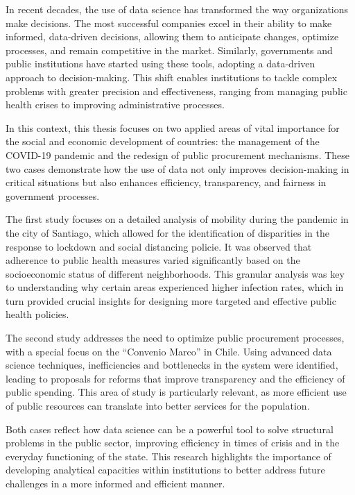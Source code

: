 

In recent decades, the use of data science has transformed the way organizations make decisions. The most successful companies excel in their ability to make informed, data-driven decisions, allowing them to anticipate changes, optimize processes, and remain competitive in the market. Similarly, governments and public institutions have started using these tools, adopting a data-driven approach to decision-making. This shift enables institutions to tackle complex problems with greater precision and effectiveness, ranging from managing public health crises to improving administrative processes.

In this context, this thesis focuses on two applied areas of vital importance for the social and economic development of countries: the management of the COVID-19 pandemic and the redesign of public procurement mechanisms. These two cases demonstrate how the use of data not only improves decision-making in critical situations but also enhances efficiency, transparency, and fairness in government processes.

The first study focuses on a detailed analysis of mobility during the pandemic in the city of Santiago, which allowed for the identification of disparities in the response to lockdown and social distancing policie. It was observed that adherence to public health measures varied significantly based on the socioeconomic status of different neighborhoods. This granular analysis was key to understanding why certain areas experienced higher infection rates, which in turn provided crucial insights for designing more targeted and effective public health policies.

The second study addresses the need to optimize public procurement processes, with a special focus on the “Convenio Marco” in Chile. Using advanced data science techniques, inefficiencies and bottlenecks in the system were identified, leading to proposals for reforms that improve transparency and the efficiency of public spending. This area of study is particularly relevant, as more efficient use of public resources can translate into better services for the population.

Both cases reflect how data science can be a powerful tool to solve structural problems in the public sector, improving efficiency in times of crisis and in the everyday functioning of the state. This research highlights the importance of developing analytical capacities within institutions to better address future challenges in a more informed and efficient manner.